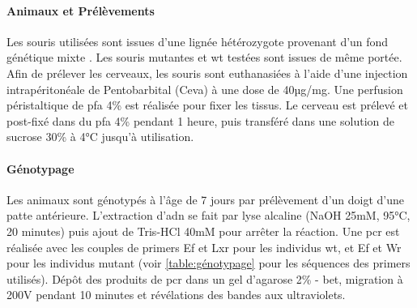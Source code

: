 \paragraph{Animaux et Prélèvements}
\label{par:AnimEtPrelev}
	Les souris utilisées sont issues d'une lignée hétérozygote provenant d'un fond génétique mixte \cite{Messeant2015, Messeant2017}. Les souris mutantes \mcrd et \gls{wt} testées sont issues de même portée. Afin de prélever les cerveaux, les souris sont  euthanasiées à l'aide d'une injection intrapéritonéale de Pentobarbital (Ceva\textregistered) à une dose de 40µg/mg. Une perfusion péristaltique de \gls{pfa} 4\% est réalisée pour fixer les tissus. Le cerveau est prélevé et post-fixé dans du \gls{pfa} 4\% pendant 1 heure, puis transféré dans une solution de sucrose 30\% à 4°C jusqu'à utilisation. 
	
\paragraph{Génotypage}
\label{par:genotypage}
	Les animaux sont génotypés à l'âge de 7 jours par prélèvement d'un doigt d'une patte antérieure. L'extraction d'\acrshort{adn} se fait par lyse alcaline (NaOH 25mM, 95°C, 20 minutes) puis ajout de Tris-HCl 40mM pour arrêter la réaction. Une \acrshort{pcr} est réalisée avec les couples de primers Ef et Lxr  pour les individus \gls{wt}, et Ef et Wr pour les individus mutant (voir \cref{table:génotypage} pour les séquences des primers utilisés). Dépôt des produits de \gls{pcr} dans un gel d'agarose 2\% - \acrshort{bet}, migration à 200V pendant 10 minutes et révélations des bandes aux ultraviolets.
	
	\begin{table}[h]
	\end{table}
\FloatBarrier
	
